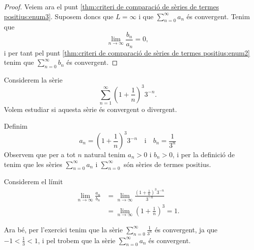 \documentclass[../../Main.tex]{subfiles}
\begin{document}
\begin{theorem}
\begin{proof}
			Veiem ara el punt \eqref{thm:criteri de comparació de sèries de termes positius:enum3}. Suposem doncs que \(L=\infty\) i que \(\sum_{n=0}^{\infty}a_{n}\) és convergent. Tenim que
			\[\lim_{n\to\infty}\frac{b_{n}}{a_{n}}=0,\] %
			i per tant pel punt \eqref{thm:criteri de comparació de sèries de termes positius:enum2} tenim que \(\sum_{n=0}^{\infty}b_{n}\) és convergent.
		\end{proof}
	\end{theorem}
	\begin{example}
		Considerem la sèrie
		\[\sum_{n=1}^{\infty}\left(1+\frac{1}{n}\right)^{3}3^{-n}.\]
		Volem estudiar si aquesta sèrie és convergent o divergent.
		\begin{solution}
			Definim
			\[a_{n}=\left(1+\frac{1}{n}\right)^{3}3^{-n}\quad\text{i}\quad b_{n}=\frac{1}{3^{n}}\]
			Observem que per a tot \(n\) natural tenim \(a_{n}>0\) i \(b_{n}>0\), i per la definició de  tenim que les sèries \(\sum_{n=0}^{\infty}a_{n}\) i \(\sum_{n=0}^{\infty}\) són sèries de termes positius.
			
			Considerem el límit
			\begin{align*}
				\lim_{n\to\infty}\frac{a_{n}}{b_{n}}&=\lim_{n\to\infty}\frac{\left(1+\frac{1}{n}\right)^{3}3^{-n}}{3^{-n}}\\
				&=\lim_{n\to\infty}\left(1+\frac{1}{n}\right)^{3}=1.
			\end{align*}
			
			Ara bé, per l'exercici  tenim que la sèrie \(\sum_{n=0}^{\infty}\frac{1}{3^{n}}\) és convergent, ja que \(-1<\frac{1}{3}<1\), i pel  trobem que la sèrie \(\sum_{n=0}^{\infty}a_{n}\) és convergent.
		\end{solution}
	\end{example}
\end{document}
